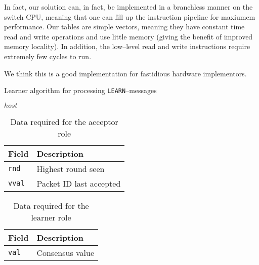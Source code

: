 In fact, our solution can, in fact, be implemented in a branchless manner on the
switch CPU, meaning that one can fill up the instruction pipeline for
maxiumem performance.  Our tables are simple vectors, meaning they
have constant time read and write operations and use little memory
(giving the benefit of improved memory locality).  In addition, the
low--level read and write instructions require extremely few cycles to run.

We think this is a good implementation for fastidious hardware implementors.

\begin{algorithm}
  \caption{Learner algorithm for processing \texttt{LEARN}--messages}
  \label{paxos.algorithm.learner}
  \begin{algorithmic}
        \State {}
                      {$host$}
      \EndForIn
    \EndOn
  \end{algorithmic}
\end{algorithm}

\begin{table}
\begin{tabular}{|l|l|}
\hline \textbf{Field} & \textbf{Description} \\
\hline \texttt{rnd} & Highest round seen \\
\hline \texttt{vval} & Packet ID last accepted \\
\hline
\end{tabular}
\caption{Data required for the acceptor role}
\label{paxos.acceptor.fields}
\end{table}

\begin{table}
\begin{tabular}{|l|l|}
\hline \textbf{Field} & \textbf{Description} \\
\hline \texttt{val} & Consensus value \\
\hline
\end{tabular}
\caption{Data required for the learner role}
\label{paxos.learner.fields}
\end{table}
